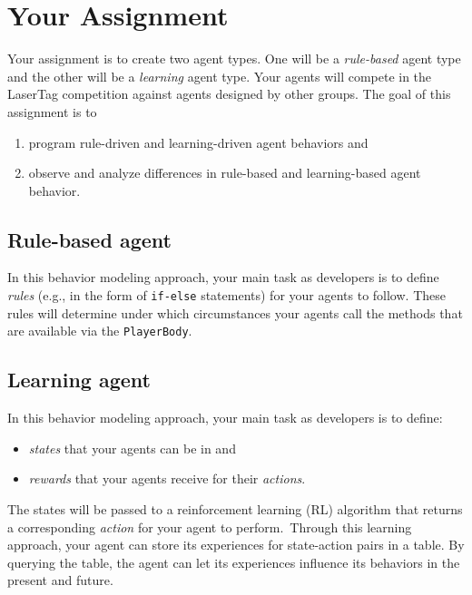 \documentclass[
    a4paper,
    english,
    DIV=16,
    11pt,
    parskip=half,
]{scrartcl}
\begin{document}

\section*{Your Assignment}
Your assignment is to create two agent types. One will be a \emph{rule-based} agent type and the other will be a \emph{learning} agent type. Your agents will compete in the LaserTag competition against agents designed by other groups. The goal of this assignment is to
\begin{enumerate}
  \item program rule-driven and learning-driven agent behaviors and
  \item observe and analyze differences in rule-based and learning-based agent behavior.
\end{enumerate}

\subsection*{Rule-based agent}
In this behavior modeling approach, your main task as developers is to define \emph{rules} (e.g., in the form of \texttt{if-else} statements) for your agents to follow. These rules will determine under which circumstances your agents call the methods that are available via the \texttt{PlayerBody}.

\subsection*{Learning agent}
In this behavior modeling approach, your main task as developers is to define:
\begin{itemize}
  \item \emph{states} that your agents can be in and
  \item \emph{rewards} that your agents receive for their \emph{actions}.
\end{itemize}
The states will be passed to a reinforcement learning (RL) algorithm that returns a corresponding \emph{action} for your agent to perform.~Through this learning approach, your agent can store its experiences for state-action pairs in a table. By querying the table, the agent can let its experiences influence its behaviors in the present and future.
\end{document}
